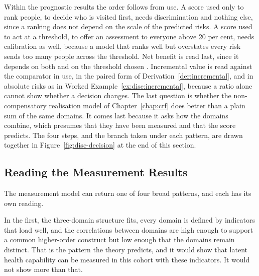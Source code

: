 Within the prognostic results the order follows from use. A score used only to
rank people, to decide who is visited first, needs discrimination and nothing
else, since a ranking does not depend on the scale of the predicted risks. A score
used to act at a threshold, to offer an assessment to everyone above 20 per cent,
needs calibration as well, because a model that ranks well but overstates every
risk sends too many people across the threshold. Net benefit is read last, since
it depends on both and on the threshold chosen \citep{vickers_elkin_2006}.
Incremental value is read against the comparator in use, in the paired form of
Derivation~\ref{der:incremental}, and in absolute risks as in Worked
Example~\ref{ex:disc:incremental}, because a ratio alone cannot show whether a
decision changes. The last question is whether the non-compensatory realisation
model of Chapter~\ref{chap:crf} does better than a plain sum of the same domains.
It comes last because it asks how the domains combine, which presumes that they
have been measured and that the score predicts. The four steps, and the branch
taken under each pattern, are drawn together in Figure~\ref{fig:disc-decision} at
the end of this section.

\subsection{Reading the Measurement Results}
\label{sec:disc-read-measure}

The measurement model can return one of four broad patterns, and each has its own
reading.

In the first, the three-domain structure fits, every domain is defined by
indicators that load well, and the correlations between domains are high enough to
support a common higher-order construct but low enough that the domains remain
distinct. That is the pattern the theory predicts, and it would show that latent
health capability can be measured in this cohort with these indicators. It would
not show more than that.

